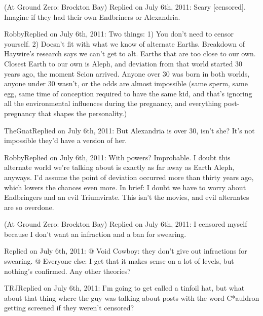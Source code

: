  (At Ground Zero: Brockton Bay)
Replied on July 6th, 2011:
Scary [censored].  Imagine if they had their own Endbriners or Alexandria.



\blacktriangleright RobbyReplied on July 6th, 2011:
Two things:
1)  You don't need to censor yourself.
2)  Doesn't fit with what we know of alternate Earths. Breakdown of Haywire's research says we can't get to alt. Earths that are too close to our own.  Closest Earth to our own is Aleph, and deviation from that world started 30 years ago, the moment Scion arrived.  Anyone over 30 was born in both worlds, anyone under 30 wasn't, or the odds are almost impossible (same sperm, same egg, same time of conception required to have the same kid, and that's ignoring all the environmental influences during the pregnancy, and everything post-pregnancy that shapes the personality.)



\blacktriangleright TheGnatReplied on July 6th, 2011:
But Alexandria is over 30, isn't she?  It's not impossible they'd have a version of her.



\blacktriangleright RobbyReplied on July 6th, 2011:
With powers?  Improbable.
I doubt this alternate world we're talking about is exactly as far away as Earth Aleph, anyways.  I'd assume the point of deviation occurred more than thirty years ago, which lowers the chances even more.
In brief:  I doubt we have to worry about Endbringers and an evil Triumvirate.  This isn't the movies, and evil alternates are so overdone.



 (At Ground Zero: Brockton Bay)
Replied on July 6th, 2011:
I censored myself because I don't want an infraction and a ban for swearing.



\blacktriangleright{}
Replied on July 6th, 2011:
@ Void Cowboy: they don't give out infractions for swearing.
@ Everyone else:  I get that it makes sense on a lot of levels, but nothing's confirmed.  Any other theories?



\blacktriangleright TRJReplied on July 6th, 2011:
I'm going to get called a tinfoil hat, but what about that thing where the guy was talking about posts with the word C*auldron getting screened if they weren't censored?



